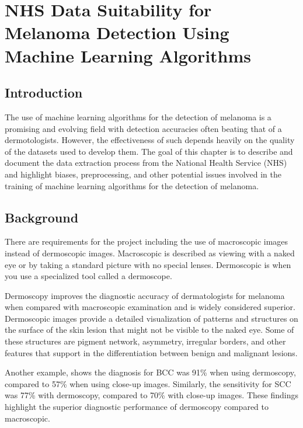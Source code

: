 \chapter{NHS Data Suitability for Melanoma Detection Using Machine Learning Algorithms}

\section{Introduction}
The use of machine learning algorithms for the detection of melanoma is a promising and evolving field with detection accuracies often beating that of a dermotologists\cite{Andre2017}. However, the effectiveness of such depends heavily on the quality of the datasets used to develop them\cite{Tae2019}. The goal of this chapter is to describe and document the data extraction process from the National Health Service (NHS) and highlight biases, preprocessing, and other potential issues involved in the training of machine learning algorithms for the detection of melanoma.


\section{Background}

There are requirements for the project including the use of macroscopic images instead of dermoscopic images. Macroscopic is described as viewing with a naked eye or by taking a standard picture with no special lenses. Dermoscopic is when you use a specialized tool called a dermoscope.

Dermoscopy improves the diagnostic accuracy of dermatologists for melanoma when compared with macroscopic examination\cite{Wolner2017} and is widely considered superior\cite{Thiers2009}. Dermoscopic images provide a detailed visualization of patterns and structures on the surface of the skin lesion that might not be visible to the naked eye\cite{Thiers2009}. Some of these structures are pigment network, asymmetry, irregular borders, and other features that support in the differentiation between benign and malignant lesions\cite{Thiers2009}. 

Another example, shows the diagnosis for BCC was 91\% when using dermoscopy, compared to 57\% when using close-up images\cite{Dascalu2022}. Similarly, the sensitivity for SCC was 77\% with dermoscopy, compared to 70\% with close-up images\cite{Dascalu2022}. These findings highlight the superior diagnostic performance of dermoscopy compared to macroscopic.

